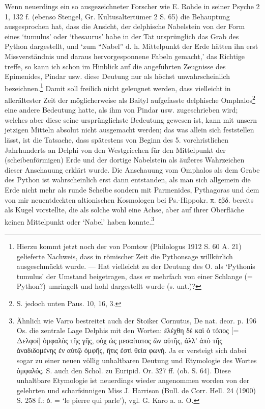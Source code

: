 \documentclass[a4paper, 11pt, oneside]{article}
\begin{document}
Wenn neuerdings ein so ausgezeichneter Forscher wie E. Rohde in seiner Psyche 2 1, 132 f. (ebenso Stengel, Gr. Kultusaltertümer 2 S. 65) die Behauptung ausgesprochen hat, dass die Ansicht, der delphische Nabelstein von der Form eines `tumulus' oder `thesaurus' habe in der Tat ursprünglich das Grab des Python dargestellt, und `zum "`Nabel"' d. h. Mittelpunkt der Erde hätten ihn erst Missverständnis und daraus hervorgesponnene Fabeln gemacht,' das Richtige treffe, so kann ich schon im Hinblick auf die angeführten Zeugnisse des Epimenides, Pindar usw. diese Deutung nur als höchst unwahrscheinlich bezeichnen.\footnote{Hierzu kommt jetzt noch der von Pomtow (Philologus 1912 S. 60 A. 21) gelieferte Nachweis, dass in römischer Zeit die Pythonsage willkürlich ausgeschmückt wurde. --- Hat vielleicht zu der Deutung des O. als `Pythonis tumulus' der Umstand beigetragen, dass er mehrfach von einer Schlange (= Python?) umringelt und hohl dargestellt wurde (s. unt.)?} Damit soll freilich nicht geleugnet werden, dass vielleicht in allerältester Zeit der möglicherweise als Baityl aufgefasste delphische Omphalos\footnote{S. jedoch unten Paus. 10, 16, 3.} eine andere Bedeutung hatte, als ihm von Pindar usw. zugeschrieben wird; welches aber diese seine ursprünglichste Bedeutung gewesen ist, kann mit unsern jetzigen Mitteln absolut nicht ausgemacht werden; das was allein sich feststellen lässt, ist die Tatsache, dass spätestens von Beginn des 5. vorchristlichen Jahrhunderts an Delphi von den Westgriechen für den Mittelpunkt der (scheibenförmigen) Erde und der dortige Nabelstein als äußeres Wahrzeichen dieser Anschauung erklärt wurde. Die Anschauung vom Omphalos als dem Grabe des Python ist wahrscheinlich erst dann entstanden, als man sich allgemein die Erde nicht mehr als runde Scheibe sondern mit Parmenides, Pythagoras und dem von mir neuentdeckten altionischen Kosmologen bei Ps.-Hippokr. π. ἑβδ. bereits als Kugel vorstellte, die als solche wohl eine Achse, aber auf ihrer Oberfläche keinen Mittelpunkt oder `Nabel' haben konnte.\footnote{Ähnlich wie Varro bestreitet auch der Stoiker Cornutus, De nat. deor. p. 196 Os. die zentrale Lage Delphis mit den Worten: ἐλέχθη δὲ καὶ ὁ τόπος [= Δελφοί] ὀμφαλὸς τῆς γῆς, οὐχ ὡς μεσαίτατος ὢν αὐτῆς, ἀλλ' ἀπὸ τῆς ἀναδιδομένης ἐν αὐτῷ ὀμφῆς, ἥτις ἐστὶ θεία φωνή. Ja er versteigt sich dabei sogar zu einer neuen völlig unhaltbaren Deutung und Etymologie des Wortes ὀμφαλός. S. auch den Schol. zu Euripid. Or. 327 ff. (ob. S. 64). Diese unhaltbare Etymologie ist neuerdings wieder angenommen worden von der gelehrten und scharfsinnigen Miss J. Harrison (Bull. de Corr. Hell. 24 (1900) S. 258 f.: ὀ. = `le pierre qui parle'), vgl. G. Karo a. a. O.}
\end{document}

